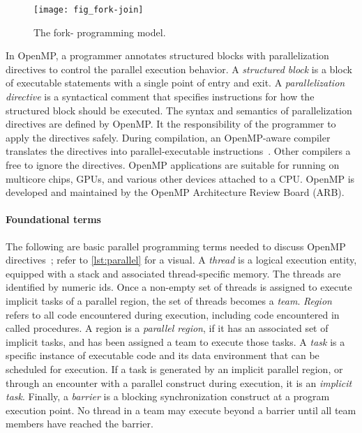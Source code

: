 \begin{figure}[H]
\centering
\texttt{[image: fig\_fork-join]}
\caption[The fork-join programming model]{The fork- programming model.}
\label{fig:fork-join}
\end{figure}

In OpenMP, a programmer annotates {structured blocks} with parallelization {directives} to control the parallel execution behavior.
A \emph{structured block} is a block of executable statements with a single point of entry and exit.
A \emph{parallelization directive} is a syntactical comment that specifies instructions for how the {structured block} should be executed.
The syntax and semantics of {parallelization directives} are defined by OpenMP.
It the responsibility of the programmer to apply the directives safely.
During compilation, an OpenMP-aware compiler translates the directives into parallel-executable instructions~\cite{oak-slides}.
Other compilers a free to ignore the directives.
OpenMP applications are suitable for running on multicore chips, GPUs, and various other devices attached to a CPU.
OpenMP is developed and maintained by the OpenMP Architecture Review Board (ARB).

\paragraph*{Foundational terms}
The following are basic parallel programming terms needed to discuss OpenMP directives~\cite{openmp_api};
refer to \autoref{lst:parallel} for a visual.
A \emph{thread} is a logical {execution entity}, equipped with a stack and associated thread-specific memory.
The threads are identified by numeric ids.
Once a non-empty set of threads is assigned to execute implicit tasks of a parallel region, the {set of threads} becomes a \emph{team}.
\emph{Region} refers to all {code} encountered during execution, including code encountered in called procedures.
A region is a \emph{parallel region}, if it has an associated set of implicit tasks, and has been assigned a team to execute those tasks.
A \emph{task} is a specific instance of {executable code and its data environment} that can be scheduled for execution.
If a task is generated by an implicit parallel region, or through an encounter with a parallel construct during execution, it is an \emph{implicit task}.
Finally, a \emph{barrier} is a blocking synchronization construct at a program {execution point}.
No thread in a team may execute beyond a barrier until all team members have reached the barrier.

